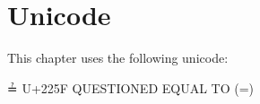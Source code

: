 \begin{fence}
\begin{code}
\AgdaSpace{}%
\AgdaSpace{}%
\AgdaSymbol{=}\<%
\\
\>[0][@{}l@{\AgdaIndent{0}}]%
\>[3]\AgdaSpace{}%
\AgdaSpace{}%
\AgdaSymbol{=}\AgdaSpace{}%
\AgdaSpace{}%
\AgdaSpace{}%
\<%
\\
%
\>[3]\AgdaSpace{}%
\AgdaSpace{}%
\AgdaSymbol{=}\AgdaSpace{}%
\AgdaSpace{}%
\AgdaSpace{}%
\<%
\\
%
\>[3]\AgdaSpace{}%
\AgdaSymbol{\{}\AgdaSymbol{\}}\AgdaSpace{}%
\AgdaSpace{}%
\AgdaSpace{}%
\AgdaSpace{}%
\<%
\end{code}
\end{fence}

\hypertarget{unicode}{%
\section{Unicode}\label{unicode}}

This chapter uses the following unicode:

\begin{myDisplay}
≟  U+225F  QUESTIONED EQUAL TO (\?=)
\end{myDisplay}

